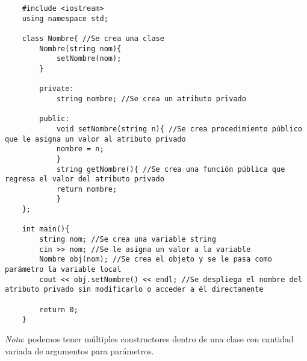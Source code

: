 \begin{lstlisting}
    #include <iostream>
    using namespace std;

    class Nombre{ //Se crea una clase
        Nombre(string nom){
            setNombre(nom);
        }
        
        private:
            string nombre; //Se crea un atributo privado
        
        public:
            void setNombre(string n){ //Se crea procedimiento público que le asigna un valor al atributo privado
            nombre = n;
            }
            string getNombre(){ //Se crea una función pública que regresa el valor del atributo privado
            return nombre;
            }
    };
    
    int main(){
        string nom; //Se crea una variable string
        cin >> nom; //Se le asigna un valor a la variable
        Nombre obj(nom); //Se crea el objeto y se le pasa como parámetro la variable local
        cout << obj.setNombre() << endl; //Se despliega el nombre del atributo privado sin modificarlo o acceder a él directamente
        
        return 0;
    }
\end{lstlisting}
\textit{Nota}: podemos tener múltiples constructores dentro de una clase con cantidad variada de argumentos para parámetros.
